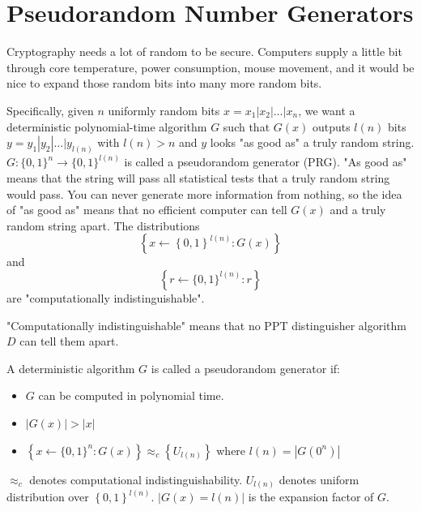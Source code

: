 \section{Pseudorandom Number Generators}

Cryptography needs a lot of random to be secure. 
Computers supply a little bit through core temperature, 
power consumption, mouse movement, and it would be nice 
to expand those random bits into many more random bits. 

Specifically, given $n$ uniformly random bits 
$x = x_1|x_2|\dots|x_n$, we want a deterministic
polynomial-time algorithm $G$ such that $G(x)$
outputs $l(n)$ bits $y=y_1|y_2|\dots|y_{l(n)}$ 
with $l(n) > n$ and $y$ looks "as good as" a truly random string. 
$G: \{0,1\}^n \rightarrow \{0,1\}^{l(n)}$ is called a pseudorandom
generator (PRG). "As good as" means that the string 
will pass all statistical tests that a truly random string 
would pass. You can never generate more information from 
nothing, so the idea of "as good as" means that no efficient 
computer can tell $G(x)$ and a truly random string apart. 
The distributions
\begin{equation}
    \left\{x \leftarrow \left\{0,1\right\}^{l(n)}: G(x) \right\}
\end{equation}
and
\begin{equation}
    \left\{r \leftarrow\{0,1\}^{l(n)}: r\right\}
\end{equation}
are "computationally indistinguishable". 

"Computationally indistinguishable" means that no PPT 
distinguisher algorithm $D$ can tell them apart. 

A deterministic algorithm $G$ is called a pseudorandom
generator if:
\begin{itemize}
    \item $G$ can be computed in polynomial time. 
    \item $|G(x)| > |x|$
    \item $\left\{x \leftarrow \{0,1\}^n : G(x) \right\} \approx_c \left\{U_{l(n)}\right\}$
    where $l(n) = |G(0^n)|$
\end{itemize}
$\approx_c$ denotes computational indistinguishability. 
$U_{l(n)}$ denotes uniform distribution over $\left\{0,1\right\}^{l(n)}$.
$|G(x) = l(n)|$ is the expansion factor of $G$. 